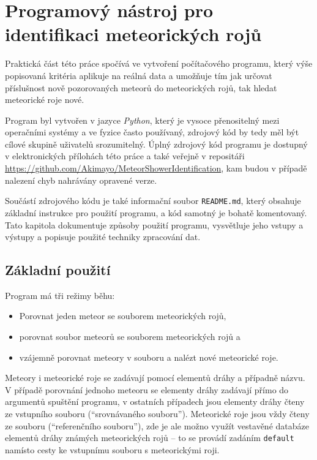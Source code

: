 \chapter{Programový nástroj pro identifikaci meteorických rojů\label{cpt:practical}}%
Praktická část této práce spočívá ve vytvoření počítačového programu, který výše popisovaná kritéria aplikuje na reálná data a umožňuje tím jak určovat příslušnost nově pozorovaných meteorů do meteorických rojů, tak hledat meteorické roje nové.

Program byl vytvořen v jazyce \textit{Python}, který je vysoce přenositelný mezi operačními systémy a ve fyzice často používaný, zdrojový kód by tedy měl být cílové skupině uživatelů srozumitelný. Úplný zdrojový kód programu je dostupný v elektronických přílohách této práce a také veřejně v repositáři \\\href{https://github.com/Akimayo/MeteorShowerIdentification}{https://github.com/Akimayo/MeteorShowerIdentification}, kam budou v případě nalezení chyb nahrávány opravené verze.

Součástí zdrojového kódu je také informační soubor \texttt{README.md}, který obsahuje základní instrukce pro použití programu, a kód samotný je bohatě komentovaný. Tato kapitola dokumentuje způsoby použití programu, vysvětluje jeho vstupy a výstupy a popisuje použité techniky zpracování dat.

\section{Základní použití}%
Program má tři režimy běhu:
\begin{itemize}
    \item Porovnat jeden meteor se souborem meteorických rojů,
    \item porovnat soubor meteorů se souborem meteorických rojů a
    \item vzájemně porovnat meteory v souboru a nalézt nové meteorické roje.
\end{itemize}

Meteory i meteorické roje se zadávají pomocí elementů dráhy a případně názvu. V případě porovnání jednoho meteoru se elementy dráhy zadávají přímo do argumentů spuštění programu, v ostatních případech jsou elementy dráhy čteny ze vstupního souboru ("`srovnávaného souboru"'). Meteorické roje jsou vždy čteny ze souboru ("`referenčního souboru"'), zde je ale možno využít vestavěné databáze elementů dráhy známých meteorických rojů -- to se provádí zadáním \texttt{default} namísto cesty ke vstupnímu souboru s meteorickými roji.

